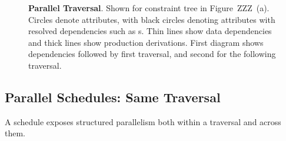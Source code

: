 \begin{figure}
\caption{\textbf{Parallel Traversal}. Shown for constraint tree  in Figure~ZZZ~(a). Circles denote attributes, with black circles denoting attributes with resolved dependencies such as s. Thin lines show data dependencies and thick lines show production derivations. First diagram shows dependencies followed by first traversal, and second for the following traversal.}
\label{fig:depsparallel}
\end{figure}


\subsection{Parallel Schedules: Same Traversal}
\label{subsec:nested}
A schedule exposes structured parallelism both within a traversal and across them. 

